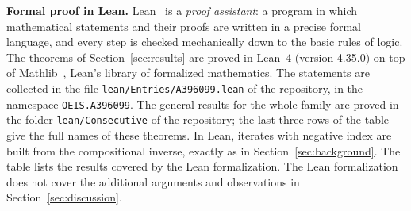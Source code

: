 \documentclass[11pt,a4paper]{article}
\theoremstyle{definition}
\theoremstyle{remark}
\newcommand{\para}[1]{\par\medskip\noindent\textbf{#1}\enspace}
\begin{document}
\para{Formal proof in Lean.}
Lean~\cite{lean} is a \emph{proof assistant}: a program in which mathematical statements and their proofs are written
in a precise formal language, and every step is checked mechanically down to the basic rules of logic. The theorems of Section~\ref{sec:results} are proved in Lean~4 (version 4.35.0) on top of
Mathlib~\cite{mathlib}, Lean's library of formalized mathematics. The statements are collected in the file \texttt{lean/Entries/A396099.lean} of the repository,
in the namespace \texttt{OEIS.A396099}. The general results for the whole family are proved in the folder \texttt{lean/Consecutive} of the
repository; the last three rows of the table give the full names of these theorems. In Lean, iterates with negative index are built from the
compositional inverse, exactly as in Section~\ref{sec:background}.
The table lists the results covered by the Lean formalization. The Lean formalization does not cover the additional arguments and observations in Section~\ref{sec:discussion}.
\end{document}
